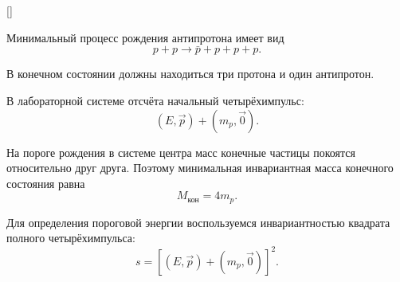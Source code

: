\documentclass[../final.tex]{subfiles}
\begin{document}
\begin{rbox}[left=18pt,right=18pt,top=14pt,bottom=10pt]{[]}
    \centering


    \captionsetup{
        font=footnotesize,
        labelfont=bf,
        skip=5pt
    }

    \label{fig:practice02_antiproton}
\end{rbox}

Минимальный процесс рождения антипротона имеет вид
%
\begin{equation*}
    p+p
    \rightarrow
    \bar p+p+p+p.
\end{equation*}

В конечном состоянии должны находиться три протона и один антипротон.

В лабораторной системе отсчёта начальный четырёхимпульс:
%
\begin{equation*}
    (E,\vec p)
    +
    (m_p,\vec 0).
\end{equation*}

На пороге рождения в системе центра масс конечные частицы покоятся
относительно друг друга. Поэтому минимальная инвариантная масса
конечного состояния равна
%
\begin{equation*}
    M_{\text{кон}}
    =
    4m_p.
\end{equation*}

Для определения пороговой энергии воспользуемся инвариантностью
квадрата полного четырёхимпульса:
%
\begin{equation*}
    s
    =
    \left[
        (E,\vec p)
        +
        (m_p,\vec 0)
    \right]^2.
\end{equation*}
\end{document}
